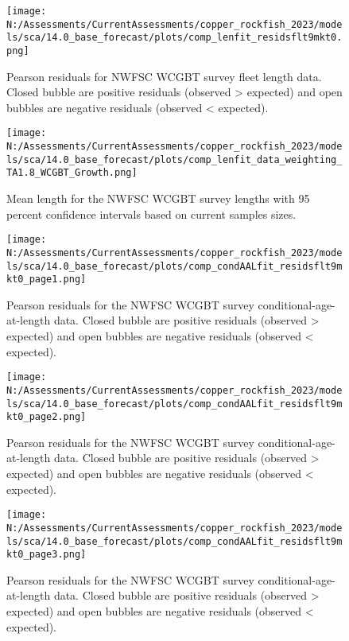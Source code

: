 \documentclass[11pt,
  english,
  letterpaper,
]{article}
\begin{document}
\begin{figure}
\centering
\texttt{[image: N:/Assessments/CurrentAssessments/copper\_rockfish\_2023/models/sca/14.0\_base\_forecast/plots/comp\_lenfit\_residsflt9mkt0.png]}
\caption{Pearson residuals for NWFSC WCGBT survey fleet length data. Closed bubble are positive residuals (observed \textgreater{} expected) and open bubbles are negative residuals (observed \textless{} expected).\label{fig:wcgbt-len-pearson}}
\end{figure}

\pagebreak

\begin{figure}
\centering
\texttt{[image: N:/Assessments/CurrentAssessments/copper\_rockfish\_2023/models/sca/14.0\_base\_forecast/plots/comp\_lenfit\_data\_weighting\_TA1.8\_WCGBT\_Growth.png]}
\caption{Mean length for the NWFSC WCGBT survey lengths with 95 percent confidence intervals based on current samples sizes.\label{fig:wcgbt-mean-len-fit}}
\end{figure}

\pagebreak

\begin{figure}
\centering
\texttt{[image: N:/Assessments/CurrentAssessments/copper\_rockfish\_2023/models/sca/14.0\_base\_forecast/plots/comp\_condAALfit\_residsflt9mkt0\_page1.png]}
\caption{Pearson residuals for the NWFSC WCGBT survey conditional-age-at-length data. Closed bubble are positive residuals (observed \textgreater{} expected) and open bubbles are negative residuals (observed \textless{} expected).\label{fig:wcgbt-age-pearson-1}}
\end{figure}

\pagebreak

\begin{figure}
\centering
\texttt{[image: N:/Assessments/CurrentAssessments/copper\_rockfish\_2023/models/sca/14.0\_base\_forecast/plots/comp\_condAALfit\_residsflt9mkt0\_page2.png]}
\caption{Pearson residuals for the NWFSC WCGBT survey conditional-age-at-length data. Closed bubble are positive residuals (observed \textgreater{} expected) and open bubbles are negative residuals (observed \textless{} expected).\label{fig:wcgbt-age-pearson-2}}
\end{figure}

\pagebreak

\begin{figure}
\centering
\texttt{[image: N:/Assessments/CurrentAssessments/copper\_rockfish\_2023/models/sca/14.0\_base\_forecast/plots/comp\_condAALfit\_residsflt9mkt0\_page3.png]}
\caption{Pearson residuals for the NWFSC WCGBT survey conditional-age-at-length data. Closed bubble are positive residuals (observed \textgreater{} expected) and open bubbles are negative residuals (observed \textless{} expected).\label{fig:wcgbt-age-pearson-3}}
\end{figure}
\end{document}
